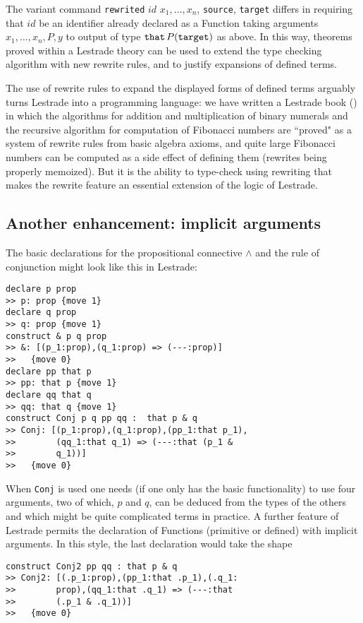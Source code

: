 \documentclass[submission,copyright,creativecommons]{eptcs}
\begin{document}
The variant command  {\tt rewrited} $id$ $x_1, \ldots, x_n$, {\tt source}, {\tt target} differs in requiring that $id$ be an identifier already declared as a Function taking arguments $x_1,\ldots,x_n,P,y$ to output of type ${\tt that}\, P({\tt target})$ as above.  In this way, theorems proved within a Lestrade theory can be used to extend the type checking algorithm with new rewrite rules, and to justify expansions of defined terms.

The use of rewrite rules to expand the displayed forms of defined terms arguably turns Lestrade into a programming language:  we have written a Lestrade book (\cite{fibonacci}) in which the algorithms for addition and multiplication of binary numerals and the recursive algorithm for computation of Fibonacci numbers are ``proved" as a system of rewrite rules from basic algebra axioms, and quite large Fibonacci numbers can be computed as a side effect of defining them (rewrites being properly memoized).  But it is the ability to type-check using rewriting that makes the rewrite feature an essential extension of the logic of Lestrade.

\subsection{Another enhancement:  implicit arguments}

The basic declarations for the propositional connective $\wedge$ and the rule of conjunction might look like this in Lestrade:

\begin{verbatim}
declare p prop
>> p: prop {move 1}
declare q prop
>> q: prop {move 1}
construct & p q prop
>> &: [(p_1:prop),(q_1:prop) => (---:prop)]
>>   {move 0}
declare pp that p
>> pp: that p {move 1}
declare qq that q
>> qq: that q {move 1}
construct Conj p q pp qq :  that p & q
>> Conj: [(p_1:prop),(q_1:prop),(pp_1:that p_1),
>>        (qq_1:that q_1) => (---:that (p_1 & 
>>        q_1))]
>>   {move 0}
\end{verbatim}

When {\tt Conj} is used one needs (if one only has the basic functionality) to use four arguments, two of which,
$p$ and $q$, can be deduced from the types of the others and which might be quite complicated terms in practice.  A further feature of Lestrade permits the declaration of Functions (primitive or defined) with implicit arguments.  In this style, the last declaration would take the shape

\begin{verbatim}
construct Conj2 pp qq : that p & q
>> Conj2: [(.p_1:prop),(pp_1:that .p_1),(.q_1:
>>        prop),(qq_1:that .q_1) => (---:that 
>>        (.p_1 & .q_1))]
>>   {move 0}
\end{verbatim}
\end{document}
